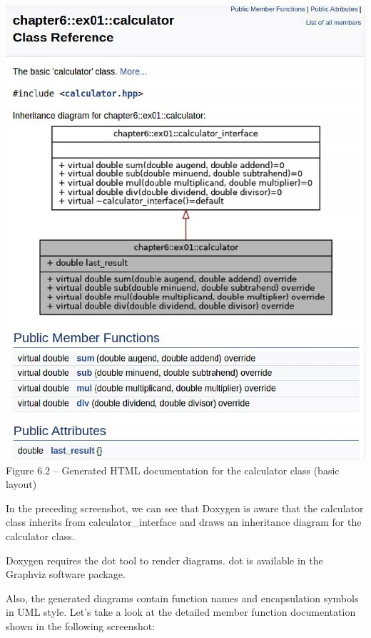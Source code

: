 \begin{center}
\includegraphics[width=1.\textwidth]{content/2/chapter6/images/2.jpg}\\
Figure 6.2 – Generated HTML documentation for the calculator class (basic layout)
\end{center}

In the preceding screenshot, we can see that Doxygen is aware that the calculator class inherits from calculator\_interface and draws an inheritance diagram for the calculator class.

\begin{tcolorbox}[colback=webgreen!5!white,colframe=webgreen!75!black,title=Note]
Doxygen requires the dot tool to render diagrams. dot is available in the Graphviz software package.
\end{tcolorbox}

Also, the generated diagrams contain function names and encapsulation symbols in UML style. Let's take a look at the detailed member function documentation shown in the following screenshot:

